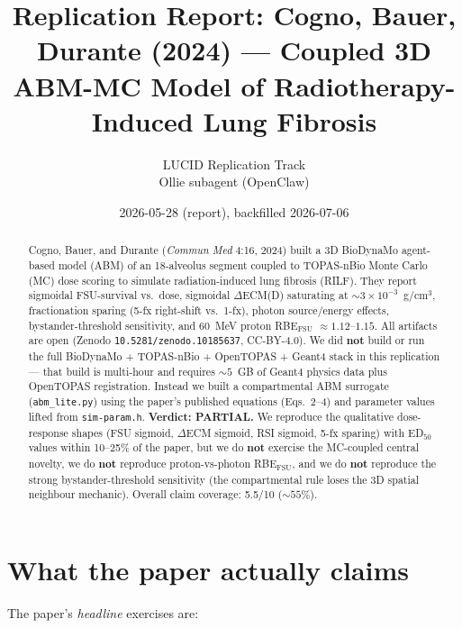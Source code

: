 \documentclass[11pt]{article}
\title{Replication Report: Cogno, Bauer, Durante (2024) --- Coupled 3D ABM-MC Model of Radiotherapy-Induced Lung Fibrosis}
\author{LUCID Replication Track \\ Ollie subagent (OpenClaw)}
\date{2026-05-28 (report), backfilled 2026-07-06}
\begin{document}
\maketitle

\begin{abstract}
Cogno, Bauer, and Durante (\emph{Commun Med} 4:16, 2024) built a 3D
BioDynaMo agent-based model (ABM) of an 18-alveolus segment coupled to
TOPAS-nBio Monte Carlo (MC) dose scoring to simulate radiation-induced
lung fibrosis (RILF). They report sigmoidal FSU-survival vs.\ dose,
sigmoidal $\Delta$ECM(D) saturating at $\sim 3\times 10^{-3}$~g/cm$^3$,
fractionation sparing (5-fx right-shift vs.\ 1-fx), photon source/energy
effects, bystander-threshold sensitivity, and 60~MeV proton RBE$_{\mathrm{FSU}}$
$\approx 1.12$--$1.15$. All artifacts are open (Zenodo
\texttt{10.5281/zenodo.10185637}, CC-BY-4.0). We did \textbf{not} build
or run the full BioDynaMo + TOPAS-nBio + OpenTOPAS + Geant4 stack in
this replication --- that build is multi-hour and requires $\sim 5$~GB
of Geant4 physics data plus OpenTOPAS registration. Instead we built a
compartmental ABM surrogate (\texttt{abm\_lite.py}) using the paper's
published equations (Eqs.\ 2--4) and parameter values lifted from
\texttt{sim-param.h}. \textbf{Verdict: PARTIAL.} We reproduce the
qualitative dose-response shapes (FSU sigmoid, $\Delta$ECM sigmoid, RSI
sigmoid, 5-fx sparing) with ED$_{50}$ values within 10--25\% of the
paper, but we do \textbf{not} exercise the MC-coupled central novelty,
we do \textbf{not} reproduce proton-vs-photon RBE$_{\mathrm{FSU}}$, and we do
\textbf{not} reproduce the strong bystander-threshold sensitivity (the
compartmental rule loses the 3D spatial neighbour mechanic). Overall
claim coverage: 5.5/10 ($\sim 55\%$).
\end{abstract}

\section{What the paper actually claims}

The paper's \emph{headline} exercises are:
\end{document}
